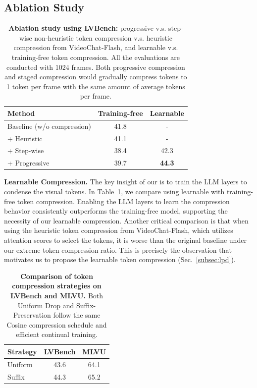\subsection{Ablation Study}\label{sec:ablation}

\begin{table}
\vspace{-13pt}
\centering

\caption{\textbf{Ablation study using LVBench:}\;\;  progressive v.s. step-wise non-heuristic token compression v.s. heuristic compression from VideoChat-Flash, and learnable v.s. training-free token compression. All the evaluations are conducted with 1024 frames. Both progressive compression and staged compression would gradually compress tokens to 1 token per frame with the same amount of average tokens per frame.}\label{tab:lvbench_ablation}
\vspace{-4pt}
\begin{tabular}{l|cc}
\toprule
\textbf{Method} & \textbf{Training-free} & \textbf{Learnable} \\
\midrule
Baseline (w/o compression) & 41.8 & - \\
\midrule
+ Heuristic & 41.1 & - \\
\midrule
+ Step-wise  & 38.4 & 42.3 \\
+ Progressive & 39.7 & \textbf{44.3} \\
\bottomrule
\end{tabular}
\vspace{-8pt}
\end{table}


\textbf{Learnable Compression.}\;\;  The key insight of our \name is to train the LLM layers to condense the visual tokens. In Table~\ref{tab:lvbench_ablation}, we compare using learnable with training-free token compression. Enabling the LLM layers to learn the compression behavior consistently outperforms the training-free model, supporting the necessity of our learnable compression. Another critical comparison is that when using the heuristic token compression from VideoChat-Flash, which utilizes attention scores to select the tokens, it is worse than the original baseline under our extreme token compression ratio. This is precisely the observation that motivates us to propose the learnable token compression (Sec.~\ref{subsec:lpd}).

\begin{table}
\vspace{-13pt}
\centering
\caption{\textbf{Comparison of token compression strategies on LVBench and MLVU.} Both Uniform Drop and Suffix-Preservation follow the same Cosine compression schedule and efficient continual training.}
\label{tab:drop-ablation}
\begin{tabular}{l|c c}
\toprule
\textbf{Strategy} & \textbf{LVBench} & \textbf{MLVU} \\
\midrule
Uniform & 43.6 & 64.1 \\
Suffix & 44.3 & 65.2 \\
\bottomrule
\end{tabular}
\vspace{-6pt}
\end{table}

